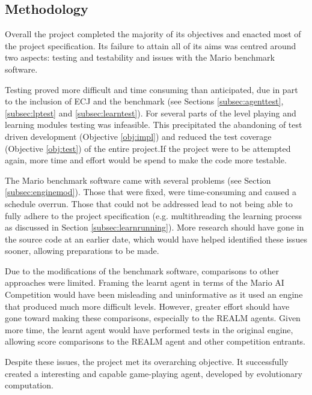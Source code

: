 
\subsection{Methodology}

Overall the project completed the majority of its objectives and enacted most of the project specification. Its failure to attain all of its aims was centred around two aspects: testing and testability and issues with the Mario benchmark software.

Testing proved more difficult and time consuming than anticipated, due in part to the inclusion of ECJ and the benchmark (see Sections \ref{subsec:agenttest}, \ref{subsec:lptest} and \ref{subsec:learntest}). For several parts of the level playing and learning modules testing was infeasible. This precipitated the abandoning of test driven development (Objective \ref{obj:impl}) and reduced the test coverage (Objective \ref{obj:test}) of the entire project.If the project were to be attempted again, more time and effort would be spend to make the code more testable.

The Mario benchmark software came with several problems (see Section \ref{subsec:enginemod}). Those that were fixed, were time-consuming and caused a schedule overrun. Those that could not be addressed lead to not being able to fully adhere to the project specification (e.g. multithreading the learning process as discussed in Section \ref{subsec:learnrunning}). More research should have gone in the source code at an earlier date, which would have helped identified these issues sooner, allowing preparations to be made.

Due to the modifications of the benchmark software, comparisons to other approaches were limited. Framing the learnt agent in terms of the Mario AI Competition would have been misleading and uninformative as it used an engine that produced much more difficult levels. However, greater effort should have gone toward making these comparisons, especially to the REALM agents. Given more time, the learnt agent would have performed tests in the original engine, allowing score comparisons to the REALM agent and other competition entrants.

Despite these issues, the project met its overarching objective. It successfully created a interesting and capable game-playing agent, developed by evolutionary computation.





